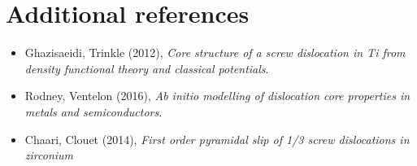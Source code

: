 \documentclass[11pt]{article}
\begin{document}
\section*{Additional references}
\label{sec:org06a518d}

\begin{itemize}
\item Ghazisaeidi, Trinkle (2012), \emph{Core structure of a screw dislocation in Ti from density functional theory and classical potentials}.
\item Rodney, Ventelon (2016), \emph{Ab initio modelling of dislocation core properties
in metals and semiconductors}.
\item Chaari, Clouet (2014), \emph{First order pyramidal slip of 1/3 screw dislocations in zirconium}
\end{itemize}
\end{document}

